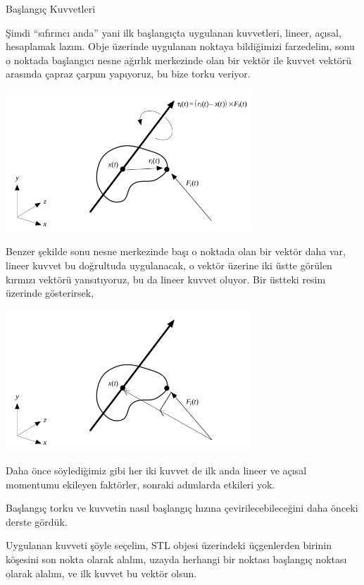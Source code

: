 \documentclass[12pt,fleqn]{article}\usepackage{../../common}
\begin{document}
Başlangıç Kuvvetleri

Şimdi ``sıfırıncı anda'' yani ilk başlangıçta uygulanan kuvvetleri, lineer,
açısal, hesaplamak lazım. Obje üzerinde uygulanan noktaya bildiğimizi
farzedelim, sonu o noktada başlangıcı nesne ağırlık merkezinde olan bir vektör
ile kuvvet vektörü arasında çapraz çarpım yapıyoruz, bu bize torku veriyor.

\includegraphics[width=25em]{phy_008_sim_rigbod_01.png}

Benzer şekilde sonu nesne merkezinde başı o noktada olan bir vektör daha var,
lineer kuvvet bu doğrultuda uygulanacak, o vektör üzerine iki üstte görülen
kırmızı vektörü yansıtıyoruz, bu da lineer kuvvet oluyor. Bir üstteki resim
üzerinde gösterirsek,

\includegraphics[width=25em]{phy_008_sim_rigbod_02.png}

Daha önce söylediğimiz gibi her iki kuvvet de ilk anda lineer ve açısal
momentumu ekileyen faktörler, sonraki adımlarda etkileri yok.

Başlangıç torku ve kuvvetin nasıl başlangıç hızına çevirilecebileceğini daha
önceki derste gördük.

Uygulanan kuvveti şöyle seçelim, STL objesi üzerindeki üçgenlerden birinin
köşesini son nokta olarak alalım, uzayda herhangi bir noktası başlangıç
noktası olarak alalım, ve ilk kuvvet bu vektör olsun.
\end{document}
